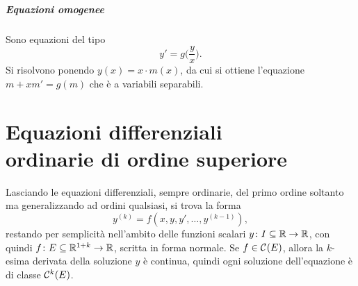 \paragraph{Equazioni omogenee}
Sono equazioni del tipo
\begin{equation}
y'=g\Big(\frac{y}{x}\Big).
\end{equation}
Si risolvono ponendo $y(x)=x\cdot m(x)$, da cui si ottiene l'equazione $m+xm'=g(m)$ che è a variabili separabili.

\chapter[Equazioni differenziali ordinarie di ordine superiore]{Equazioni differenziali\\ordinarie di ordine superiore}
Lasciando le equazioni differenziali, sempre ordinarie, del primo ordine soltanto ma generalizzando ad ordini qualsiasi, si trova la forma
\begin{equation} \label{eq:diff-k}
y^{(k)}=f(x,y,y',\dots,y^{(k-1)}),
\end{equation}
restando per semplicità nell'ambito delle funzioni scalari $y\colon I\subseteq\mathbb{R}\to\mathbb{R}$, con quindi $f\colon E\subseteq\mathbb{R}^{1+k}\to\mathbb{R}$, scritta in forma normale.
Se $f\in\mathcal{C}^{{}}(E)$, allora la $k$-esima derivata della soluzione $y$ è continua, quindi ogni soluzione dell'equazione è di classe $\mathcal{C}^{{k}}(E)$.

